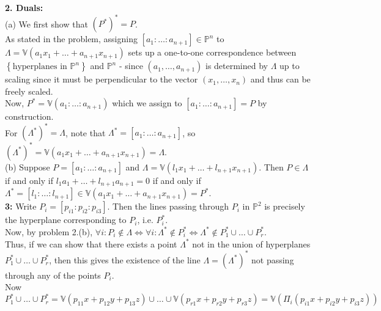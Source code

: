 \documentclass[a4paper]{article}
\begin{document}
    \textbf{2. Duals:}\\
    (a) We first show that $\left( P^{*} \right)^{*} = P$.\\
    As stated in the problem,
    assigning $\left[ a_1 : \ldots : a_{n+1} \right] 
    \in \mathbb{P}^{n}$ to
    $\Lambda = \mathbb{V}\left( a_1 x_1 +\ldots
    + a_{n+1} x_{n+1} \right) $ sets up a one-to-one correspondence between
    $\left\{ \text{hyperplanes in }\mathbb{P}^{n} \right\} $ 
    and $\mathbb{P}^{n}$ - since
    $(a_1, \ldots, a_{n+1})$ is determined by $\Lambda$ up to scaling since it
    must be perpendicular to the vector
    $(x_1, \ldots, x_n)$ and thus can be freely scaled.\\
    \linebreak
    Now,
    $P^{*} = \mathbb{V}\left( 
    a_1  : \ldots : a_{n+1}\right) $ which we assign
    to $\left[ a_1 : \ldots : a_{n+1} \right] = P$ by construction.\\
    \linebreak
    For $\left( \Lambda^{*} \right)^{*} = \Lambda$, note that
    $\Lambda^{*} = \left[ a_1  : \ldots : a_{n+1} \right] $, so
    $\left( \Lambda^{*} \right)^{*} = 
    \mathbb{V} \left( a_1 x_1 + \ldots
     + a_{n+1} x_{n+1} \right) = \Lambda$.\\
     \linebreak
     (b) Suppose 
     $P = \left[ a_1 : \ldots : a_{n+1} \right] $ and
     $\Lambda = \mathbb{V}
     (l_1 x_1 + \ldots + l_{n+1} x_{n+1})$. Then
     $P \in \Lambda$ if and only if
     $l_1 a_1 + \ldots + l_{n+1}a_{n+1} = 0$ if and only if
     $\Lambda^* =
     \left[ l_1 : \ldots : l_{n+1} \right] 
     \in \mathbb{V}\left( a_1 x_1 + \ldots +
     a_{n+1} x_{n+1} \right) 
     = P^{*}$.\\
     \linebreak
     \textbf{3:} Write $P_i = \left[ p_{i 1} :
     p_{i 2} : p_{i 3} \right] $. Then the lines
     passing through $P_i$ in $\mathbb{P}^2$ is precisely
     the hyperplane corresponding to $P_i$, i.e.
     $P_i^{*}$.\\
     Now, by problem 2.(b),
     $\forall i  \colon P_i \not\in \Lambda \iff
     \forall i  \colon \Lambda^* \not\in  P_i^{*}
     \iff \Lambda^{*} 
     \not\in P_1^{*} \cup \ldots \cup 
     P_r^{*}$.\\
     Thus, if we can show that there exists
     a point $\Lambda^{*}$ not in the union of hyperplanes
     $P_1^{*} \cup \ldots \cup P_r^{*}$, then this gives the existence of the
     line $\Lambda = \left( \Lambda^{*} \right)^{*}$ not passing through any of
     the points $P_i$.\\
     \linebreak
     Now
     \[
     P_1^{*} \cup \ldots \cup P_r^{*}
     = \mathbb{V}\left( p_{1 1} x +
     p_{1 2} y + p_{1 3}z\right) \cup 
     \ldots \cup 
     \mathbb{V}\left( p_{r 1}x+ p_{r 2}y + p_{r 3}z \right) 
     = \mathbb{V}\left( 
     \Pi_i \left( p_{i 1}x + p_{i 2}y + p_{i 3}z \right)   \right) 
     \] 
     
\end{document}
